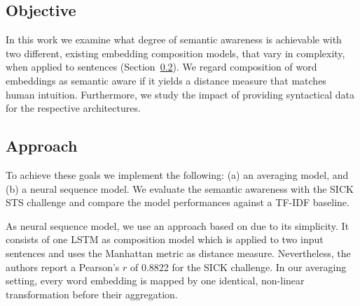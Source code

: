 
\subsection{Objective}
In this work we examine what degree of semantic awareness is achievable with two different, existing embedding composition models, that vary in complexity, when applied to sentences (Section~\ref{sec:approach}).%
We regard composition of word embeddings as semantic aware if it yields a distance measure that matches human intuition. Furthermore, we study the impact of providing syntactical data for the respective architectures.

\subsection{Approach}
\label{sec:approach}
To achieve these goals we implement the following: (a) an averaging model, and (b) a neural sequence model. We evaluate the semantic awareness with the SICK \ac{STS} challenge \autocite{marelli_sick_2014} and compare the model performances against a \acs{TF-IDF} baseline.



As neural sequence model, we use an approach based on \Textcite{mueller_siamese_2016} due to its simplicity. It consists of one LSTM as composition model which is applied to two input sentences and uses the Manhattan metric as distance measure. Nevertheless, the authors report a Pearson's $r$ of 0.8822 for the SICK challenge. In our averaging setting, every word embedding is mapped by one identical, non-linear transformation before their aggregation.

